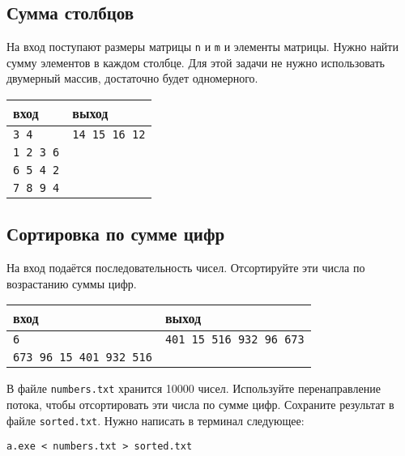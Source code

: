 \documentclass[10pt]{article}
\begin{document}
\subsection{Сумма столбцов}
На вход поступают размеры матрицы \texttt{n} и \texttt{m} и элементы матрицы. Нужно найти сумму элементов в каждом столбце. Для этой задачи не нужно использовать двумерный массив, достаточно будет одномерного.
\begin{center}
\begin{tabular}{ l | l }
 вход & выход \\ \hline
 \texttt{3 4} &    \texttt{14 15 16 12}  \\ 
 \texttt{1 2 3 6} &  \\
 \texttt{6 5 4 2} &  \\ 
 \texttt{7 8 9 4} &  \\ 
\end{tabular}
\end{center}


\subsection{Сортировка по сумме цифр}
На вход подаётся последовательность чисел. Отсортируйте эти числа по возрастанию суммы цифр.
\begin{center}
\begin{tabular}{ l | l }
 вход & выход \\ \hline
 \texttt{6} & \texttt{401 15 516 932 96 673}  \\  
 \texttt{673 96 15 401 932 516} &  \\
\end{tabular}
\end{center}
В файле \texttt{numbers.txt} хранится 10000 чисел. Используйте перенаправление потока, чтобы отсортировать эти числа по сумме цифр. Сохраните результат в файле \texttt{sorted.txt}. Нужно написать в терминал следующее:

\begin{verbatim}
a.exe < numbers.txt > sorted.txt
\end{verbatim}
\end{document}
